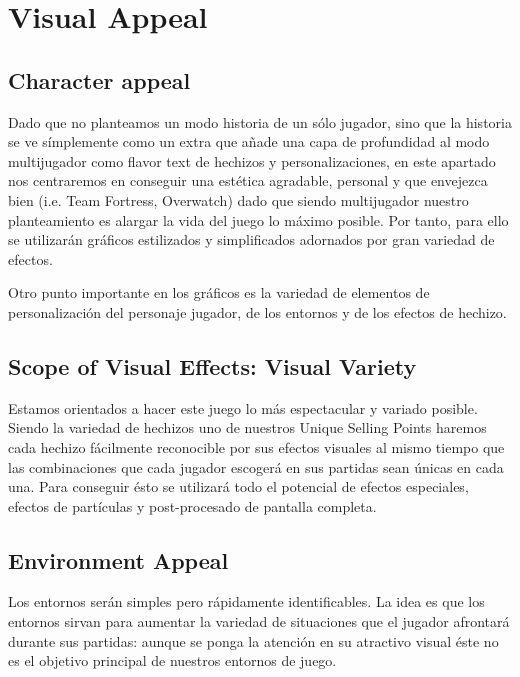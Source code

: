 \documentclass[12pt]{report}
\begin{document}
\newpage

\section{Visual Appeal}

\subsection{Character appeal}

Dado que no planteamos un modo historia de un sólo jugador, sino que la historia se ve símplemente como un extra que añade una capa de profundidad al modo multijugador como flavor text de hechizos y personalizaciones, en este apartado nos centraremos en conseguir una estética agradable, personal y que envejezca bien (i.e. Team Fortress, Overwatch) dado que siendo multijugador nuestro planteamiento es alargar la vida del juego lo máximo posible. Por tanto, para ello se utilizarán gráficos estilizados y simplificados adornados por gran variedad de efectos.

Otro punto importante en los gráficos es la variedad de elementos de personalización del personaje jugador, de los entornos y de los efectos de hechizo.

\subsection{Scope of Visual Effects: Visual Variety}

Estamos orientados a hacer este juego lo más espectacular y variado posible. Siendo la variedad de hechizos uno de nuestros Unique Selling Points haremos cada hechizo fácilmente reconocible por sus efectos visuales al mismo tiempo que las combinaciones que cada jugador escogerá en sus partidas sean únicas en cada una. Para conseguir ésto se utilizará todo el potencial de efectos especiales, efectos de partículas y post-procesado de pantalla completa.

\subsection{Environment Appeal}

Los entornos serán simples pero rápidamente identificables. La idea es que los entornos sirvan para aumentar la variedad de situaciones que el jugador afrontará durante sus partidas: aunque se ponga la atención en su atractivo visual éste no es el objetivo principal de nuestros entornos de juego.
\end{document}
